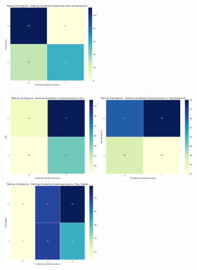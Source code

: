 \documentclass[a4paper, 12pt]{article}
\begin{document}
\begin{figure}[H]
    \includegraphics[width=0.45\textwidth]{img/Heatmap/Accidentes_Hipertension.png}
\end{figure}


\begin{figure}[H]
    \includegraphics[width=0.45\textwidth]{img/Heatmap/Accidentes_Sex.png} \hspace{0.5cm}
    \includegraphics[width=0.45\textwidth]{img/Heatmap/Accidentes_Tipo_Residencia.png} \vspace{0.5cm}
    \vspace{0.3cm}
    \includegraphics[width=0.45\textwidth]{img/Heatmap/Accidentes_Tipo_Trabajo.png}
\end{figure}
\end{document}
